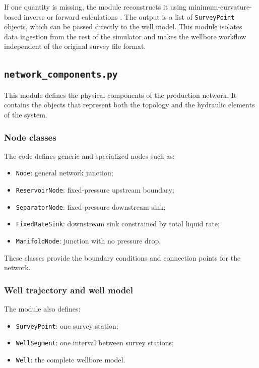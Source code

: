 If one quantity is missing, the module reconstructs it using
minimum-curvature-based inverse or forward calculations \cite{Wolff1981}. The
output is a list of \texttt{SurveyPoint} objects, which can be passed directly
to the well model. This module isolates data ingestion from the rest of the
simulator and makes the wellbore workflow independent of the original survey
file format.

\subsection*{\texttt{network\_components.py}}

This module defines the physical components of the production network. It
contains the objects that represent both the topology and the hydraulic elements
of the system.

\subsubsection*{Node classes}

The code defines generic and specialized nodes such as:

\begin{itemize}
    \item \texttt{Node}: general network junction;
    \item \texttt{ReservoirNode}: fixed-pressure upstream boundary;
    \item \texttt{SeparatorNode}: fixed-pressure downstream sink;
    \item \texttt{FixedRateSink}: downstream sink constrained by total liquid
          rate;
    \item \texttt{ManifoldNode}: junction with no pressure drop.
\end{itemize}

These classes provide the boundary conditions and connection points for the
network.

\subsubsection*{Well trajectory and well model}

The module also defines:

\begin{itemize}
    \item \texttt{SurveyPoint}: one survey station;
    \item \texttt{WellSegment}: one interval between survey stations;
    \item \texttt{Well}: the complete wellbore model.
\end{itemize}

